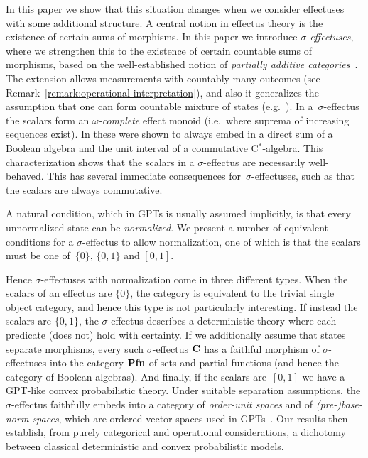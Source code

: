 \documentclass[%
	submission,
copyright,creativecommons,UKenglish]{eptcs}
\begin{document}
In this paper we show that this situation changes when we
consider effectuses with some additional structure.
A central notion in effectus theory is the existence of certain sums of morphisms.
In this paper we introduce \emph{$\sigma$-effectuses},
where we strengthen this to the existence of
certain countable sums of morphisms,
based on the well-established notion of
\emph{partially additive categories}~\cite{ArbibM1980,ManesA1986}.
The extension allows
measurements with countably many
outcomes (see Remark~\ref{remark:operational-interpretation}),
and also it generalizes
the assumption that one can form
countable mixture of states
(e.g.\ \cite{Mackey2004,EdwardsG1970,Edwards1970}).
In a~$\sigma$-effectus the scalars form an \emph{$\omega$-complete}
effect monoid (i.e.~where suprema of increasing sequences exist).
In \cite{effectmonoids} these were shown to always embed in a
direct sum of a Boolean algebra and the unit interval of a commutative C$^*$-algebra.
This characterization shows that the scalars in a $\sigma$-effectus
are necessarily well-behaved. This has several immediate
consequences for~$\sigma$-effectuses, such as that the scalars are
always commutative.

A natural condition, which in GPTs is usually assumed implicitly,
is that every unnormalized state can be \emph{normalized}.
We present a number of equivalent conditions for a $\sigma$-effectus to allow normalization, one of which is that the scalars
must be one of~$\{0\}$, $\{0,1\}$ and $[0,1]$.

Hence $\sigma$-effectuses with normalization come in three different
types.  When the scalars of an effectus are $\{0\}$, the category is
equivalent to the trivial single object category, and hence this
type is not particularly interesting.
If instead the scalars are $\{0,1\}$, the $\sigma$-effectus describes a
deterministic theory where each predicate (does not) hold with certainty.
If we additionally assume that states separate morphisms,
every such $\sigma$-effectus $\mathbf{C}$ has a faithful morphism
of $\sigma$-effectuses into
the category $\mathbf{Pfn}$ of sets and partial functions
(and hence the category of Boolean algebras).
And finally, if the scalars are~$[0,1]$ we have a GPT-like convex
probabilistic theory.
Under suitable separation assumptions,
the $\sigma$-effectus faithfully embeds into
a category of \emph{order-unit spaces} and
of \emph{(pre-)base-norm spaces},
which are ordered vector spaces used in
GPTs~\cite{BarnumW2016,CassinelliL2016}.
Our results then establish, from purely categorical and operational
considerations, a dichotomy between classical deterministic
and convex probabilistic models.
\end{document}
